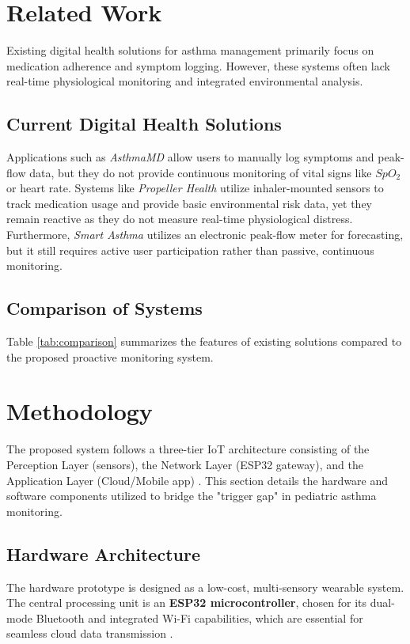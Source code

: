 \documentclass[two column]{article}
\begin{document}
\section{Related Work}
Existing digital health solutions for asthma management primarily focus on medication adherence and symptom logging. However, these systems often lack real-time physiological monitoring and integrated environmental analysis.

\subsection{Current Digital Health Solutions}
Applications such as \textit{AsthmaMD} allow users to manually log symptoms and peak-flow data, but they do not provide continuous monitoring of vital signs like $SpO_2$ or heart rate. Systems like \textit{Propeller Health} utilize inhaler-mounted sensors to track medication usage and provide basic environmental risk data, yet they remain reactive as they do not measure real-time physiological distress. Furthermore, \textit{Smart Asthma} utilizes an electronic peak-flow meter for forecasting, but it still requires active user participation rather than passive, continuous monitoring.

\subsection{Comparison of Systems}
Table \ref{tab:comparison} summarizes the features of existing solutions compared to the proposed proactive monitoring system.


\section{Methodology}
The proposed system follows a three-tier IoT architecture consisting of the Perception Layer (sensors), the Network Layer (ESP32 gateway), and the Application Layer (Cloud/Mobile app) \cite{Li2018}. This section details the hardware and software components utilized to bridge the "trigger gap" in pediatric asthma monitoring.

\subsection{Hardware Architecture}
The hardware prototype is designed as a low-cost, multi-sensory wearable system. The central processing unit is an \textbf{ESP32 microcontroller}, chosen for its dual-mode Bluetooth and integrated Wi-Fi capabilities, which are essential for seamless cloud data transmission \cite{Li2018, IJERT2021}. 
\end{document}
